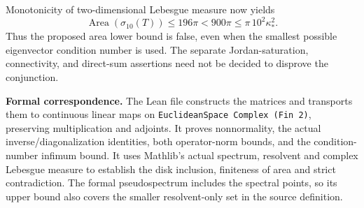 \documentclass[11pt]{article}
\begin{document}
Monotonicity of two-dimensional Lebesgue measure now yields
\[
 \operatorname{Area}(\sigma_{10}(T))\leq196\pi
 <900\pi\leq\pi\,10^2\kappa_*^2.
\]
Thus the proposed area lower bound is false, even when the smallest possible eigenvector condition number is used. The separate Jordan-saturation, connectivity, and direct-sum assertions need not be decided to disprove the conjunction.

\textbf{Formal correspondence.} The Lean file constructs the matrices and transports them to continuous linear maps on \texttt{EuclideanSpace Complex (Fin 2)}, preserving multiplication and adjoints. It proves nonnormality, the actual inverse/diagonalization identities, both operator-norm bounds, and the condition-number infimum bound. It uses Mathlib's actual spectrum, resolvent and complex Lebesgue measure to establish the disk inclusion, finiteness of area and strict contradiction. The formal pseudospectrum includes the spectral points, so its upper bound also covers the smaller resolvent-only set in the source definition.
\end{document}
